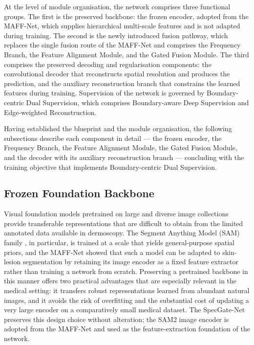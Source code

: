 At the level of module organisation, the network comprises three functional groups. The first is the preserved backbone: the frozen encoder, adopted from the MAFF-Net, which supplies hierarchical multi-scale features and is not adapted during training. The second is the newly introduced fusion pathway, which replaces the single fusion route of the MAFF-Net and comprises the Frequency Branch, the Feature Alignment Module, and the Gated Fusion Module. The third comprises the preserved decoding and regularisation components: the convolutional decoder that reconstructs spatial resolution and produces the prediction, and the auxiliary reconstruction branch that constrains the learned features during training. Supervision of the network is governed by Boundary-centric Dual Supervision, which comprises Boundary-aware Deep Supervision and Edge-weighted Reconstruction.

Having established the blueprint and the module organisation, the following subsections describe each component in detail --- the frozen encoder, the Frequency Branch, the Feature Alignment Module, the Gated Fusion Module, and the decoder with its auxiliary reconstruction branch --- concluding with the training objective that implements Boundary-centric Dual Supervision.

\subsection{Frozen Foundation Backbone}
\label{subsec:backbone}

Visual foundation models pretrained on large and diverse image collections provide transferable representations that are difficult to obtain from the limited annotated data available in dermoscopy. The Segment Anything Model (SAM) family \cite{ref9}, in particular, is trained at a scale that yields general-purpose spatial priors, and the MAFF-Net showed that such a model can be adapted to skin-lesion segmentation by retaining its image encoder as a fixed feature extractor rather than training a network from scratch. Preserving a pretrained backbone in this manner offers two practical advantages that are especially relevant in the medical setting: it transfers robust representations learned from abundant natural images, and it avoids the risk of overfitting and the substantial cost of updating a very large encoder on a comparatively small medical dataset. The SpecGate-Net preserves this design choice without alteration; the SAM2 image encoder \cite{ref10} is adopted from the MAFF-Net and used as the feature-extraction foundation of the network.

